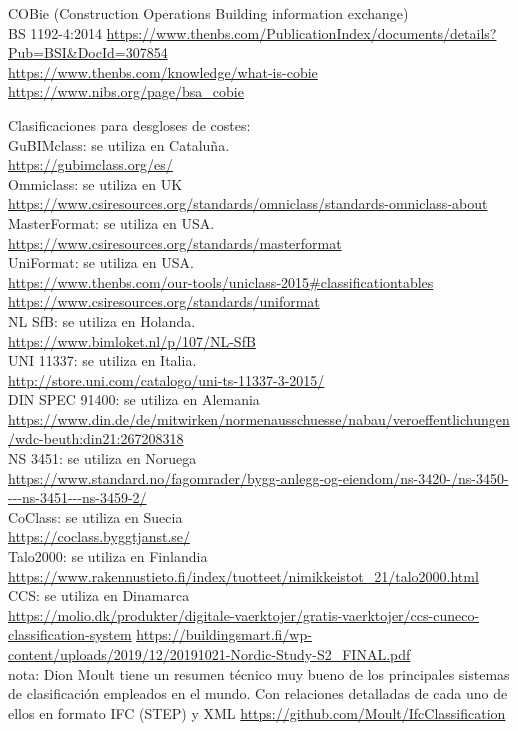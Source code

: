\documentclass[spanish,12pt,a4paper,final,oneside]{book}
\begin{document}
\vspace{0.3cm}
COBie (Construction Operations Building information exchange)
\\BS 1192-4:2014 \url{https://www.thenbs.com/PublicationIndex/documents/details?Pub=BSI&DocId=307854}
\\ \url{https://www.thenbs.com/knowledge/what-is-cobie}
\\ \url{https://www.nibs.org/page/bsa_cobie}

\vspace{0.3cm}
Clasificaciones para desgloses de costes:
\\GuBIMclass: se utiliza en Cataluña.
\\ \url{https://gubimclass.org/es/}
\\Ommiclass: se utiliza en UK
\\ \url{https://www.csiresources.org/standards/omniclass/standards-omniclass-about}
\\MasterFormat: se utiliza en USA.
\\ \url{https://www.csiresources.org/standards/masterformat}
\\UniFormat: se utiliza en USA.
\\ \url{https://www.thenbs.com/our-tools/uniclass-2015#classificationtables}
\\ \url{https://www.csiresources.org/standards/uniformat}
\\NL SfB:  se utiliza en Holanda.
\\ \url{https://www.bimloket.nl/p/107/NL-SfB}
\\UNI 11337: se utiliza en Italia.
\\ \url{http://store.uni.com/catalogo/uni-ts-11337-3-2015/}
\\DIN SPEC 91400: se utiliza en Alemania 
\\ \url{https://www.din.de/de/mitwirken/normenausschuesse/nabau/veroeffentlichungen/wdc-beuth:din21:267208318}
\\NS 3451: se utiliza en Noruega
\\ \url{https://www.standard.no/fagomrader/bygg-anlegg-og-eiendom/ns-3420-/ns-3450----ns-3451---ns-3459-2/}
\\CoClass: se utiliza en Suecia
\\ \url{https://coclass.byggtjanst.se/}
\\Talo2000: se utiliza en Finlandia
\\ \url{https://www.rakennustieto.fi/index/tuotteet/nimikkeistot_21/talo2000.html}
\\CCS: se utiliza en Dinamarca
\\ \url{https://molio.dk/produkter/digitale-vaerktojer/gratis-vaerktojer/ccs-cuneco-classification-system}
\url{https://buildingsmart.fi/wp-content/uploads/2019/12/20191021-Nordic-Study-S2_FINAL.pdf}
\\nota: Dion Moult tiene un resumen técnico muy bueno de los principales sistemas de clasificación empleados en el mundo. Con relaciones detalladas de cada uno de ellos en formato IFC (STEP) y XML  \url{https://github.com/Moult/IfcClassification}
\end{document}

